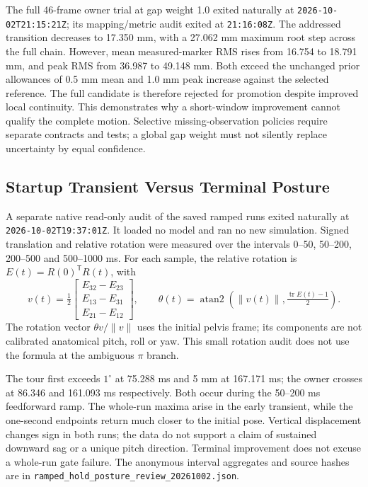 \documentclass[11pt,a4paper]{article}
\begin{document}
The full 46-frame owner trial at gap weight 1.0 exited naturally at
\texttt{2026-10-02T21:15:21Z}; its mapping/metric audit exited at
\texttt{21:16:08Z}. The addressed transition decreases to 17.350 mm,
with a 27.062 mm maximum root step across the full chain. However,
mean measured-marker RMS rises from 16.754 to 18.791 mm, and peak RMS
from 36.987 to 49.148 mm. Both exceed the unchanged prior allowances
of 0.5 mm mean and 1.0 mm peak increase against the selected reference.
The full candidate is therefore rejected for promotion despite improved
local continuity. This demonstrates why a short-window improvement
cannot qualify the complete motion. Selective missing-observation
policies require separate contracts and tests; a global gap weight
must not silently replace uncertainty by equal confidence.


\subsection{Startup Transient Versus Terminal Posture}
A separate native read-only audit of the saved ramped runs exited
naturally at \texttt{2026-10-02T19:37:01Z}. It loaded no model and ran
no new simulation. Signed translation and relative rotation were measured
over the intervals 0--50, 50--200, 200--500 and 500--1000 ms. For each
sample, the relative rotation is $E(t)=R(0)^\mathsf{T}R(t)$, with
\[
 v(t)=\tfrac12\begin{bmatrix}E_{32}-E_{23}\\E_{13}-E_{31}\\E_{21}-E_{12}\end{bmatrix},
 \qquad
 \theta(t)=\operatorname{atan2}\!\left(\|v(t)\|,\tfrac{\operatorname{tr}E(t)-1}{2}\right).
\]
The rotation vector $\theta v/\|v\|$ uses the initial pelvis frame; its
components are not calibrated anatomical pitch, roll or yaw. This small
rotation audit does not use the formula at the ambiguous $\pi$ branch.

The tour first exceeds $1^\circ$ at 75.288 ms and 5 mm at 167.171 ms;
the owner crosses at 86.346 and 161.093 ms respectively. Both occur
during the 50--200 ms feedforward ramp. The whole-run maxima arise in
the early transient, while the one-second endpoints return much closer
to the initial pose. Vertical displacement changes sign in both runs;
the data do not support a claim of sustained downward sag or a unique
pitch direction. Terminal improvement does not excuse a whole-run gate
failure. The anonymous interval aggregates and source hashes are in
\texttt{ramped\_hold\_posture\_review\_20261002.json}.
\end{document}
